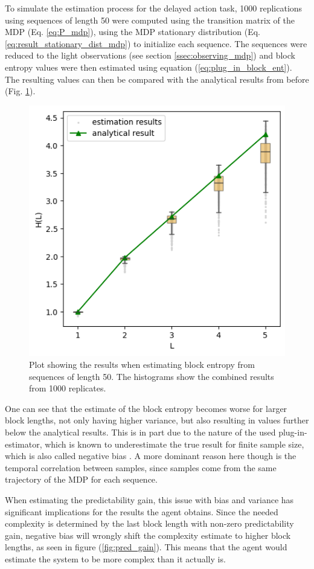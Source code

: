 \documentclass[12pt,a4paper]{article}
\begin{document}
To simulate the estimation process for the delayed action task, 1000 replications using sequences of length 50 were computed using the transition matrix of the MDP (Eq. \ref{eq:P_mdp}), using the MDP stationary distribution (Eq. \ref{eq:result_stationary_dist_mdp}) to initialize each sequence.
The sequences were reduced to the light observations (see section \ref{ssec:observing_mdp}) and block entropy values were then estimated using equation (\ref{eq:plug_in_block_ent}).
The resulting values can then be compared with the analytical results from before (Fig. \ref{fig:entropy_est}).

\begin{figure}[H]
    \centering
    \includegraphics[width=0.6\linewidth]{../figures/block_entropy_estimation_thesis.png}
    \caption{\label{fig:entropy_est} Plot showing the results when estimating block entropy from sequences of length 50. The histograms show the combined results from 1000 replicates.}
\end{figure}

One can see that the estimate of the block entropy becomes worse for larger block lengths, not only having higher variance, but also resulting in values further below the analytical results.
This is in part due to the nature of the used plug-in-estimator, which is known to underestimate the true result for finite sample size, which is also called negative bias \autocite{basharin1959plugin}.
A more dominant reason here though is the temporal correlation between samples, since samples come from the same trajectory of the MDP for each sequence.

When estimating the predictability gain, this issue with bias and variance has significant implications for the results the agent obtains.
Since the needed complexity is determined by the last block length with non-zero predictability gain, negative bias will wrongly shift the complexity estimate to higher block lengths, as seen in figure (\ref{fig:pred_gain}).
This means that the agent would estimate the system to be more complex than it actually is.
\end{document}
